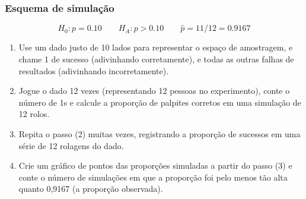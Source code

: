 \documentclass[11pt]{beamer}
\begin{document}
\begin{frame}
\frametitle{Esquema de simulação}

\vspace{-0.5cm}
\[ H_0: p = 0.10 \qquad H_A: p > 0.10 \qquad \hat{p} = 11 / 12 = 0.9167 \]

\begin{enumerate}

\item Use um dado justo de 10 lados para representar o espaço de amostragem, e chame 1 de sucesso (adivinhando corretamente), e todas as outras falhas de resultados (adivinhando incorretamente).


\item Jogue o dado 12 vezes (representando 12 pessoas no experimento), conte o número de 1s e calcule a proporção de palpites corretos em uma simulação de 12 rolos.

\item Repita o passo (2) muitas vezes, registrando a proporção de sucessos em uma série de 12 rolagens do dado.

\item Crie um gráfico de pontos das proporções simuladas a partir do passo (3) e conte o número de simulações em que a proporção foi pelo menos tão alta quanto 0,9167 (a proporção observada).

\end{enumerate}

\end{frame}

\end{document}
